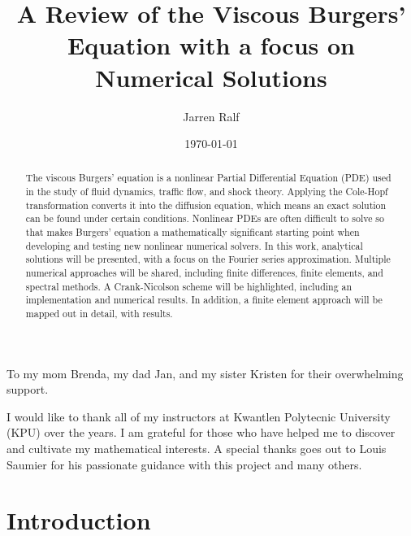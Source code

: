 \documentclass[undefended]{sfuthesis}
\title{A Review of the Viscous Burgers' Equation with a focus on Numerical Solutions}
\author{Jarren Ralf}
\date{\today}
\begin{document}
\frontmatter
\maketitle{}
\makecommittee{}

\begin{abstract}
	The viscous Burgers' equation is a nonlinear Partial Differential Equation (PDE) used in the study of fluid dynamics, traffic flow, and shock theory. Applying the Cole-Hopf transformation converts it into the diffusion equation, which means an exact solution can be found under certain conditions. Nonlinear PDEs are often difficult to solve so that makes Burgers' equation a mathematically significant starting point when developing and testing new nonlinear numerical solvers. In this work, analytical solutions will be presented, with a focus on the Fourier series approximation. Multiple numerical approaches will be shared, including finite differences, finite elements, and spectral methods. A Crank-Nicolson scheme will be highlighted, including an implementation and numerical results. In addition, a finite element approach will be mapped out in detail, with results. 
\end{abstract}

\begin{dedication}
	To my mom Brenda, my dad Jan, and my sister Kristen for their overwhelming support.
\end{dedication}

\begin{acknowledgements}
	I would like to thank all of my instructors at Kwantlen Polytecnic University (KPU) over the years. I am grateful for those who have helped me to discover and cultivate my mathematical interests. A special thanks goes out to Louis Saumier for his passionate guidance with this project and many others. 
\end{acknowledgements}

%
\tableofcontents%
\clearpage

%
\listoftables%
\clearpage

%
\listoffigures%
\clearpage

%
\listofalgorithms
\clearpage

\mainmatter%

\chapter{Introduction}
\end{document}
